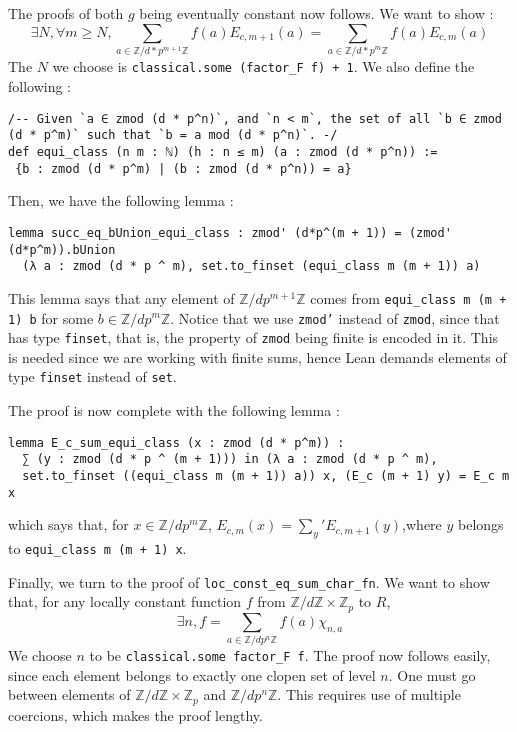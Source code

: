 \documentclass[a4paper,UKenglish,cleveref, autoref, thm-restate]{lipics-v2021}
\newcommand{\lean}[1]{\texttt{#1}\xspace} %
\begin{document}
The proofs of both $g$ being eventually constant now follows. We want to show : 
$$ \exists N, \forall m \ge N, \sum_{a \in \mathbb{Z}/d*p^{m + 1} \mathbb{Z}} f(a) E_{c,m + 1}(a) = \sum_{a \in \mathbb{Z}/d*p^{m} \mathbb{Z}} f(a) E_{c,m}(a) $$
The $N$ we choose is \lean{classical.some (factor\_F f) + 1}. We also define the following : 
\begin{lstlisting}
/-- Given `a ∈ zmod (d * p^n)`, and `n < m`, the set of all `b ∈ zmod (d * p^m)` such that `b = a mod (d * p^n)`. -/
def equi_class (n m : ℕ) (h : n ≤ m) (a : zmod (d * p^n)) :=
 {b : zmod (d * p^m) | (b : zmod (d * p^n)) = a}
\end{lstlisting}
Then, we have the following lemma :
\begin{lstlisting}
lemma succ_eq_bUnion_equi_class : zmod' (d*p^(m + 1)) = (zmod' (d*p^m)).bUnion
  (λ a : zmod (d * p ^ m), set.to_finset (equi_class m (m + 1)) a) 
\end{lstlisting}
This lemma says that any element of $\mathbb{Z}/dp^{m + 1} \mathbb{Z}$ comes from \lean{equi\_class m (m + 1) b} for some $b \in \mathbb{Z}/dp^m \mathbb{Z}$. 
Notice that we use \lean{zmod'} instead of \lean{zmod}, since that has type \lean{finset}, that is, the property of \lean{zmod} being finite is encoded in it. This 
is needed since we are working with finite sums, hence Lean demands elements of type \lean{finset} instead of \lean{set}. 

The proof is now complete with the following lemma :
\begin{lstlisting}
lemma E_c_sum_equi_class (x : zmod (d * p^m)) :
  ∑ (y : zmod (d * p ^ (m + 1))) in (λ a : zmod (d * p ^ m), 
  set.to_finset ((equi_class m (m + 1)) a)) x, (E_c (m + 1) y) = E_c m x
\end{lstlisting}
which says that, for $x \in \mathbb{Z}/dp^m \mathbb{Z}$, $E_{c, m} (x) = \sum_{y}' E_{c, m + 1} (y)$,\newline where $y$ belongs to \lean{equi\_class m (m + 1) x}. 

Finally, we turn to the proof of \lean{loc\_const\_eq\_sum\_char\_fn}. We want to show that, for any locally constant function $f$ from 
$\mathbb{Z}/d \mathbb{Z} \times \mathbb{Z}_p$ to $R$, 
$$\exists n, f = \sum_{a \in \mathbb{Z}/dp^n \mathbb{Z}} f(a) \chi_{n, a}$$
We choose $n$ to be \lean{classical.some factor\_F f}. The proof now follows easily, since each element belongs to exactly one clopen set of level $n$. One must go 
between elements of $\mathbb{Z}/d \mathbb{Z} \times \mathbb{Z}_p$ and $\mathbb{Z}/dp^n \mathbb{Z}$. This requires use of multiple coercions, which makes the proof lengthy. 
\end{document}
